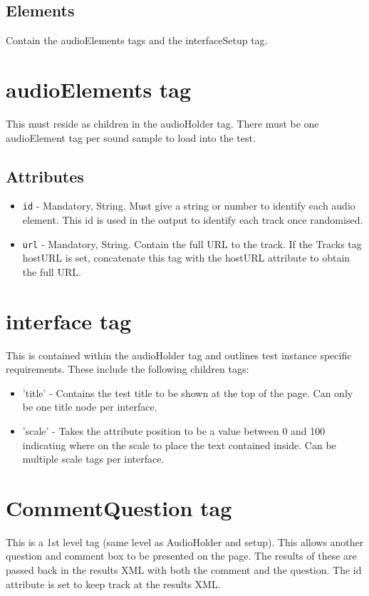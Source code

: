 \documentclass{article}
\begin{document}
\subsection{Elements}
Contain the audioElements tags and the interfaceSetup tag.

\section{audioElements tag}

This must reside as children in the audioHolder tag. There must be one audioElement tag per sound sample to load into the test.

\subsection{Attributes}
\begin{itemize}
\item \texttt{id} - Mandatory, String. Must give a string or number to identify each audio element. This id is used in the output to identify each track once randomised.
\item \texttt{url} - Mandatory, String. Contain the full URL to the track. If the Tracks tag hostURL is set, concatenate this tag with the hostURL attribute to obtain the full URL.
\end{itemize}

\section{interface tag}

This is contained within the audioHolder tag and outlines test instance specific requirements. These include the following children tags:
\begin{itemize}
\item 'title' - Contains the test title to be shown at the top of the page. Can only be one title node per interface.
\item 'scale' - Takes the attribute position to be a value between 0 and 100 indicating where on the scale to place the text contained inside. Can be multiple scale tags per interface.
\end{itemize}

\section {CommentQuestion tag}

This is a 1st level tag (same level as AudioHolder and setup). This allows another question and comment box to be presented on the page. The results of these are passed back in the results XML with both the comment and the question. The id attribute is set to keep track at the results XML.
\end{document}
